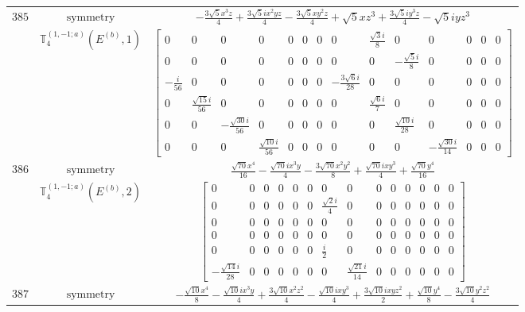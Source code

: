 \documentclass[fleqn,8pt,landscape]{jsarticle}
\begin{document}
\begin{longtable}{ccc}
$ 385 $ & $ \text{symmetry} $ & $ - \frac{3 \sqrt{5} x^{3} z}{4} + \frac{3 \sqrt{5} i x^{2} y z}{4} - \frac{3 \sqrt{5} x y^{2} z}{4} + \sqrt{5} x z^{3} + \frac{3 \sqrt{5} i y^{3} z}{4} - \sqrt{5} i y z^{3} $ \\
$  $ & $ \mathbb{T}_{4}^{(1,-1;a)}(E^{(b)},1) $ & $ \begin{bmatrix} 0 & 0 & 0 & 0 & 0 & 0 & 0 & 0 & \frac{\sqrt{3} i}{8} & 0 & 0 & 0 & 0 & 0 \\ 0 & 0 & 0 & 0 & 0 & 0 & 0 & 0 & 0 & - \frac{\sqrt{5} i}{8} & 0 & 0 & 0 & 0 \\ - \frac{i}{56} & 0 & 0 & 0 & 0 & 0 & 0 & - \frac{3 \sqrt{6} i}{28} & 0 & 0 & 0 & 0 & 0 & 0 \\ 0 & \frac{\sqrt{15} i}{56} & 0 & 0 & 0 & 0 & 0 & 0 & \frac{\sqrt{6} i}{7} & 0 & 0 & 0 & 0 & 0 \\ 0 & 0 & - \frac{\sqrt{30} i}{56} & 0 & 0 & 0 & 0 & 0 & 0 & \frac{\sqrt{10} i}{28} & 0 & 0 & 0 & 0 \\ 0 & 0 & 0 & \frac{\sqrt{10} i}{56} & 0 & 0 & 0 & 0 & 0 & 0 & - \frac{\sqrt{30} i}{14} & 0 & 0 & 0 \end{bmatrix} $ \\ \hline
$ 386 $ & $ \text{symmetry} $ & $ \frac{\sqrt{70} x^{4}}{16} - \frac{\sqrt{70} i x^{3} y}{4} - \frac{3 \sqrt{70} x^{2} y^{2}}{8} + \frac{\sqrt{70} i x y^{3}}{4} + \frac{\sqrt{70} y^{4}}{16} $ \\
$  $ & $ \mathbb{T}_{4}^{(1,-1;a)}(E^{(b)},2) $ & $ \begin{bmatrix} 0 & 0 & 0 & 0 & 0 & 0 & 0 & 0 & 0 & 0 & 0 & 0 & 0 & 0 \\ 0 & 0 & 0 & 0 & 0 & 0 & \frac{\sqrt{2} i}{4} & 0 & 0 & 0 & 0 & 0 & 0 & 0 \\ 0 & 0 & 0 & 0 & 0 & 0 & 0 & 0 & 0 & 0 & 0 & 0 & 0 & 0 \\ 0 & 0 & 0 & 0 & 0 & 0 & 0 & 0 & 0 & 0 & 0 & 0 & 0 & 0 \\ 0 & 0 & 0 & 0 & 0 & 0 & \frac{i}{2} & 0 & 0 & 0 & 0 & 0 & 0 & 0 \\ - \frac{\sqrt{14} i}{28} & 0 & 0 & 0 & 0 & 0 & 0 & \frac{\sqrt{21} i}{14} & 0 & 0 & 0 & 0 & 0 & 0 \end{bmatrix} $ \\ \hline
$ 387 $ & $ \text{symmetry} $ & $ - \frac{\sqrt{10} x^{4}}{8} - \frac{\sqrt{10} i x^{3} y}{4} + \frac{3 \sqrt{10} x^{2} z^{2}}{4} - \frac{\sqrt{10} i x y^{3}}{4} + \frac{3 \sqrt{10} i x y z^{2}}{2} + \frac{\sqrt{10} y^{4}}{8} - \frac{3 \sqrt{10} y^{2} z^{2}}{4} $ \\

\end{longtable}
\end{document}
